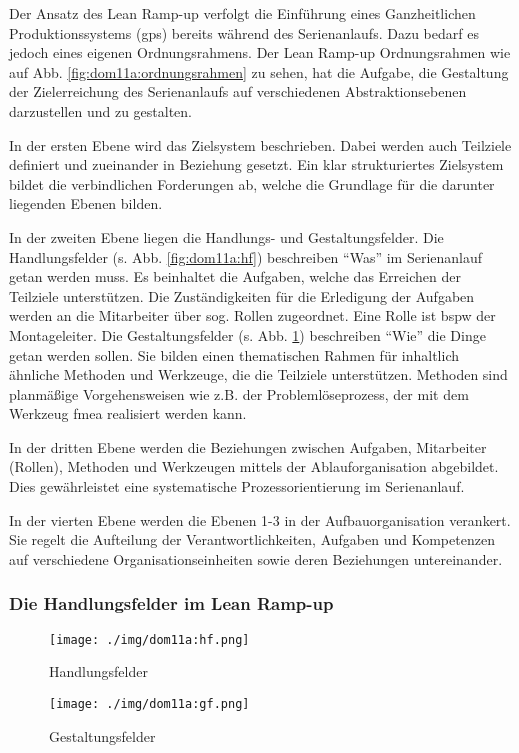 Der Ansatz des Lean Ramp-up verfolgt die Einführung eines Ganzheitlichen Produktionssystems (\gls{gps}) bereits während des Serienanlaufs. Dazu bedarf es jedoch eines eigenen Ordnungsrahmens. Der Lean Ramp-up Ordnungsrahmen wie auf Abb. \ref{fig:dom11a:ordnungsrahmen} zu sehen, hat die Aufgabe, die Gestaltung der Zielerreichung des Serienanlaufs auf verschiedenen Abstraktionsebenen darzustellen und zu gestalten. 

In der ersten Ebene wird das Zielsystem beschrieben. Dabei werden auch Teilziele definiert und zueinander in Beziehung gesetzt. Ein klar strukturiertes Zielsystem bildet die verbindlichen Forderungen ab, welche die Grundlage für die darunter liegenden Ebenen bilden. 

In der zweiten Ebene liegen die Handlungs- und Gestaltungsfelder. Die Handlungsfelder (s. Abb. \ref{fig:dom11a:hf}) beschreiben ``Was'' im Serienanlauf getan werden muss. Es beinhaltet die Aufgaben, welche das Erreichen der Teilziele unterstützen. Die Zuständigkeiten für die Erledigung der Aufgaben werden an die Mitarbeiter über sog. Rollen zugeordnet. Eine Rolle ist \gls{bspw} der Montageleiter. 
Die Gestaltungsfelder (s. Abb. \ref{fig:dom11a:gf}) beschreiben ``Wie'' die Dinge getan werden sollen. Sie bilden einen thematischen Rahmen für inhaltlich ähnliche Methoden und Werkzeuge, die die Teilziele unterstützen. Methoden sind planmäßige Vorgehensweisen wie z.B. der Problemlöseprozess, der mit dem Werkzeug \gls{fmea} %
realisiert werden kann.  

In der dritten Ebene werden die Beziehungen zwischen Aufgaben, Mitarbeiter (Rollen), Methoden und Werkzeugen mittels der Ablauforganisation abgebildet. Dies gewährleistet eine systematische Prozessorientierung im Serienanlauf. 

In der vierten Ebene werden die Ebenen 1-3 in der Aufbauorganisation verankert. Sie regelt die Aufteilung der Verantwortlichkeiten, Aufgaben und Kompetenzen auf verschiedene Organisationseinheiten sowie deren Beziehungen untereinander. %

\subsubsection{Die Handlungsfelder im Lean Ramp-up}\label{sec:dom11a:hf}
\begin{figure}[!ht] 
    \begin{minipage}{0.45\linewidth} 
    \begin{center}
 \texttt{[image: ./img/dom11a:hf.png]}
 \caption{Handlungsfelder \cite{Dombrowski2011a}}\label{fig:dom11a:hf}
\end{center}
    \end{minipage} 
    \hfill 
    \begin{minipage}{0.45\linewidth} 
 \texttt{[image: ./img/dom11a:gf.png]}
 \caption{Gestaltungsfelder\cite{Dombrowski2011a}}\label{fig:dom11a:gf}
    \end{minipage} 
  \end{figure} 

